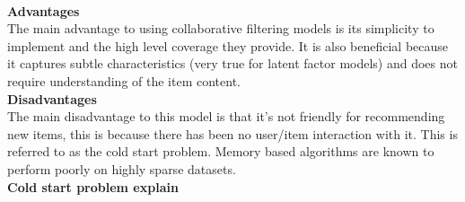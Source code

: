 \\\textbf{Advantages}
\\The main advantage to using collaborative filtering models is its simplicity to implement and the high level coverage they provide. It is also beneficial because it captures subtle characteristics (very true for latent factor models) and does not require understanding of the item content.
\\ \textbf{Disadvantages}
\\The main disadvantage to this model is that it’s not friendly for recommending new items, this is because there has been no user/item interaction with it. This is referred to as the cold start problem. Memory based algorithms are known to perform poorly on highly sparse datasets.
\\ \textbf{Cold start problem explain}


